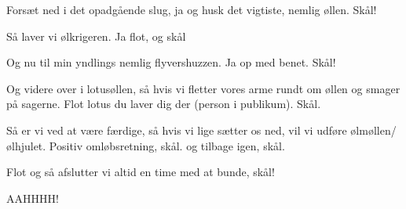 \documentclass[a4paper,11pt]{article}
\begin{document}
\begin{sketch}

 Forsæt ned i det opadgående slug, ja og husk det vigtiste, nemlig øllen. Skål!


 Så laver vi ølkrigeren. Ja flot, og skål


 Og nu til min yndlings nemlig flyvershuzzen. Ja op med benet. Skål!


 Og videre over i lotusøllen, så hvis vi fletter vores arme rundt om øllen og smager på sagerne. Flot lotus du laver dig der (person i publikum). Skål.

 Så er vi ved at være færdige, så hvis vi lige sætter os ned, vil vi udføre ølmøllen/ølhjulet. Positiv omløbsretning, skål. og tilbage igen, skål.

 Flot og så afslutter vi altid en time med at bunde, skål!


 AAHHHH!

\end{sketch}
\end{document}
